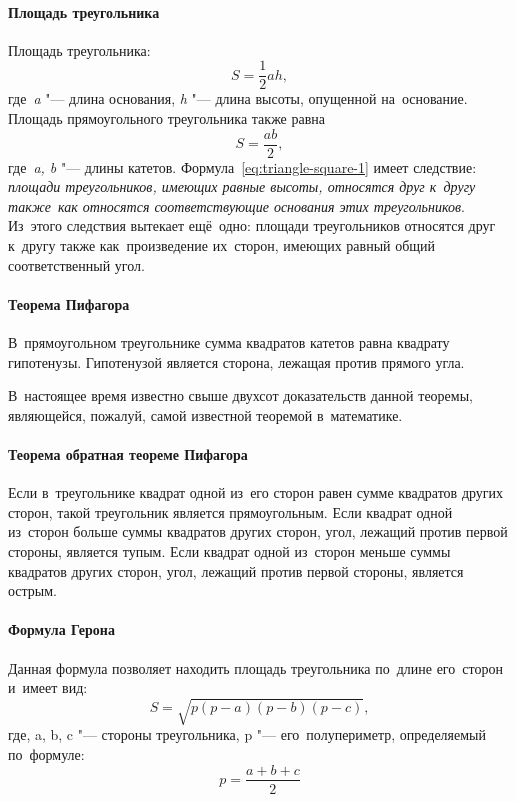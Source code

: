 \documentclass[]{scrartcl}
\begin{document}
\paragraph{Площадь треугольника}
Площадь треугольника:
\begin{equation}\label{eq:triangle-square-1}
S=\frac{1}{2}ah,
\end{equation} 
где~\textit{a} "--- длина основания, \textit{h} "--- длина высоты, опущенной на~основание.
Площадь прямоугольного треугольника также равна
\begin{equation}\label{eq:triangle-square-2}
S=\frac{ab}{2},
\end{equation}
где~\textit{a, b} "--- длины катетов.
Формула~\ref{eq:triangle-square-1} имеет следствие: \emph{площади треугольников, имеющих равные высоты, относятся друг к~другу также~как относятся соответствующие основания этих треугольников}. Из~этого следствия вытекает ещё~одно: площади треугольников относятся друг к~другу также как~произведение их~сторон, имеющих равный общий соответственный угол.

\paragraph{Теорема Пифагора}
\begin{theorem}
	В~прямоугольном треугольнике сумма квадратов катетов равна квадрату гипотенузы. Гипотенузой является сторона, лежащая против прямого угла.
\end{theorem}
 В~настоящее время известно свыше двухсот  доказательств данной теоремы, являющейся, пожалуй, самой известной теоремой в~математике. 
 
\paragraph{Теорема обратная теореме Пифагора}
\begin{theorem}
	Если в~треугольнике квадрат одной из~его сторон равен сумме квадратов других сторон, такой треугольник является прямоугольным. Если квадрат одной из~сторон больше суммы квадратов других сторон, угол, лежащий против первой стороны, является тупым. Если квадрат одной из~сторон меньше суммы квадратов других сторон, угол, лежащий против первой стороны, является острым.
\end{theorem}

\paragraph{Формула Герона}
Данная формула позволяет находить площадь треугольника по~длине его~сторон и~имеет вид:
\begin{equation}\label{eq:formula-geron}
S=\sqrt{p(p-a)(p-b)(p-c)},
\end{equation}
где, a, b, c "--- стороны треугольника, p "--- его~полупериметр, определяемый по~формуле:
\begin{equation}\label{eq:half-perimeter}
p=\frac{a+b+c}{2}
\end{equation}
\end{document}

